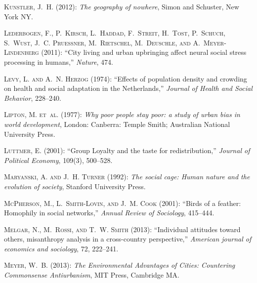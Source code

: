 \documentclass[11pt, letterpaper]{article}
\begin{document}
\begin{spacing}{1.4}
\begin{thebibliography}{92}
\textsc{Kunstler, J.~H.} (2012): \emph{The geography of nowhere}, Simon and
  Schuster, New York NY.

\textsc{Lederbogen, F., P.~Kirsch, L.~Haddad, F.~Streit, H.~Tost, P.~Schuch,
  S.~Wust, J.~C. Pruessner, M.~Rietschel, M.~Deuschle, and
  A.~{Meyer-Lindenberg}} (2011): \enquote{City living and urban upbringing
  affect neural social stress processing in humans,} \emph{Nature}, 474.

\textsc{Levy, L. and A.~N. Herzog} (1974): \enquote{Effects of population
  density and crowding on health and social adaptation in the Netherlands,}
  \emph{Journal of Health and Social Behavior}, 228--240.

\textsc{Lipton, M. et~al.} (1977): \emph{Why poor people stay poor: a study of
  urban bias in world development}, London: Canberra: Temple Smith; Australian
  National University Press.
  
\textsc{Luttmer, E.} (2001): \enquote{Group Loyalty and the taste for redistribution,} \emph{Journal of Political Economy}, 109(3), 500--528.

\textsc{Maryanski, A. and J.~H. Turner} (1992): \emph{The social cage: Human
  nature and the evolution of society}, Stanford University Press.

\textsc{McPherson, M., L.~Smith-Lovin, and J.~M. Cook} (2001): \enquote{Birds
  of a feather: Homophily in social networks,} \emph{Annual Review of
  Sociology}, 415--444.

\textsc{Melgar, N., M.~Rossi, and T.~W. Smith} (2013): \enquote{Individual
  attitudes toward others, misanthropy analysis in a cross-country
  perspective,} \emph{American journal of economics and sociology}, 72,
  222--241.

\textsc{Meyer, W.~B.} (2013): \emph{The Environmental Advantages of Cities:
  Countering Commonsense Antiurbanism}, MIT Press, Cambridge MA.


\end{thebibliography}
\end{spacing}
\end{document}
